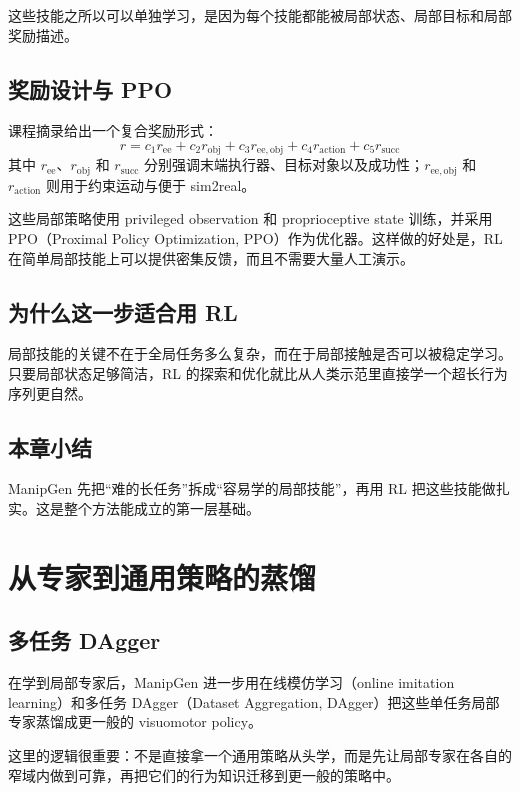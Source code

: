 \documentclass[a4paper]{article}
\begin{document}
这些技能之所以可以单独学习，是因为每个技能都能被局部状态、局部目标和局部奖励描述。

\subsection{奖励设计与 PPO}

课程摘录给出一个复合奖励形式：
\[
r = c_1 r_{\mathrm{ee}} + c_2 r_{\mathrm{obj}} + c_3 r_{\mathrm{ee,obj}} + c_4 r_{\mathrm{action}} + c_5 r_{\mathrm{succ}}
\]
其中 \(r_{\mathrm{ee}}\)、\(r_{\mathrm{obj}}\) 和 \(r_{\mathrm{succ}}\) 分别强调末端执行器、目标对象以及成功性；\(r_{\mathrm{ee,obj}}\) 和 \(r_{\mathrm{action}}\) 则用于约束运动与便于 sim2real。

这些局部策略使用 privileged observation 和 proprioceptive state 训练，并采用 PPO（Proximal Policy Optimization, PPO）作为优化器。这样做的好处是，RL 在简单局部技能上可以提供密集反馈，而且不需要大量人工演示。

\subsection{为什么这一步适合用 RL}

局部技能的关键不在于全局任务多么复杂，而在于局部接触是否可以被稳定学习。只要局部状态足够简洁，RL 的探索和优化就比从人类示范里直接学一个超长行为序列更自然。

\subsection{本章小结}

ManipGen 先把“难的长任务”拆成“容易学的局部技能”，再用 RL 把这些技能做扎实。这是整个方法能成立的第一层基础。

\section{从专家到通用策略的蒸馏}

\subsection{多任务 DAgger}

在学到局部专家后，ManipGen 进一步用在线模仿学习（online imitation learning）和多任务 DAgger（Dataset Aggregation, DAgger）把这些单任务局部专家蒸馏成更一般的 visuomotor policy。

这里的逻辑很重要：不是直接拿一个通用策略从头学，而是先让局部专家在各自的窄域内做到可靠，再把它们的行为知识迁移到更一般的策略中。
\end{document}
